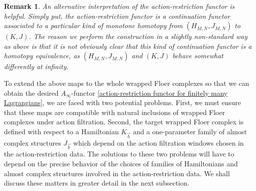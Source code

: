 \documentclass{amsart}
\newtheorem{remark}[theorem]{Remark}
\numberwithin{equation}{section}
\numberwithin{figure}{section}
\begin{document}
\begin{remark}
	An alternative interpretation of the action-restriction functor is helpful. Simply put, the action-restriction functor is a continuation functor associated to a particular kind of monotone homotopy from $(H_{M, N}, J_{M, N})$ to $(K, J)$. The reason we perform the construction in a slightly non-standard way as above is that it is not obviously clear that this kind of continuation functor is a homotopy equivalence, as $(H_{M, N}, J_{M, N})$ and $(K, J)$ behave somewhat differently at infinity. \par
\end{remark}

	To extend the above maps to the whole wrapped Floer complexes so that we can obtain the desired $A_{\infty}$-functor \eqref{action-restriction functor for finitely many Lagrangians}, we are faced with two potential problems. First, we must ensure that these maps are compatible with natural inclusions of wrapped Floer complexes under action filtration. Second, the target wrapped Floer complex is defined with respect to a Hamiltonian $K_{\vec{b}}$ and a one-parameter family of almost complex structures $J_{\vec{b}}$ which depend on the action filtration windows chosen in the action-restriction data. The solutions to these two problems will have to depend on the precise behavior of the choices of families of Hamiltonians and almost complex structures involved in the action-restriction data. We shall discuss these matters in greater detail in the next subsection. \par
\end{document}
